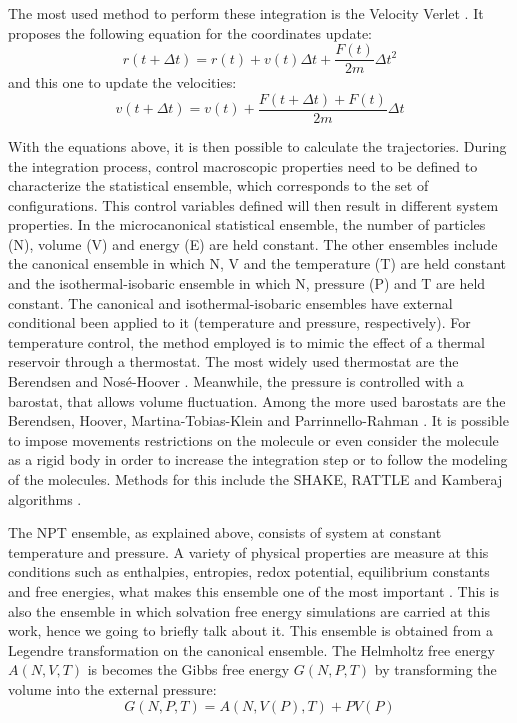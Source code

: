 The most used method to perform these integration is the Velocity Verlet \cite{verlet}. It proposes the following equation for the coordinates update:
\begin{equation}
r(t+ \Delta t) = r(t) +v(t) \Delta t + \frac{F(t)}{2m} \Delta t^{2}
\end{equation}
and this one to update the velocities:
\begin{equation}
v(t+ \Delta t) = v(t) +\frac{F(t+ \Delta t) +F(t)}{2m} \Delta t
\end{equation}

With the equations above, it is then possible to calculate the trajectories. During the integration process, control macroscopic properties need to be defined  to characterize the statistical ensemble, which corresponds to the set of configurations.  This control variables defined will then result in different system properties. In the microcanonical statistical ensemble, the number of particles (N), volume (V) and energy (E) are held constant.  The other ensembles include the canonical ensemble in which N, V and the temperature (T) are held constant and the isothermal-isobaric ensemble in which N, pressure (P) and T are held constant.  The canonical and isothermal-isobaric ensembles have external conditional been applied to it (temperature and pressure, respectively). For temperature control, the method employed  is to mimic the effect of a thermal reservoir through a thermostat. The most widely used thermostat are the Berendsen and Nosé-Hoover \cite{doi:10.1063/1.448118,PhysRevA.31.1695}. Meanwhile, the pressure is controlled with a barostat, that allows volume fluctuation. Among the more used barostats are the Berendsen, Hoover, Martina-Tobias-Klein and Parrinnello-Rahman \cite{doi:10.1063/1.448118,PhysRevA.31.1695,doi:10.1063/1.467468,doi:10.1063/1.328693}. It is possible to impose movements restrictions on the molecule or even consider the molecule as a rigid body in order to increase the integration step or to follow the modeling of the molecules. Methods for this include the SHAKE, RATTLE and Kamberaj algorithms \cite{RYCKAERT1977327,anderson1983,kamberaj}. 

The NPT ensemble, as explained above, consists of system at constant temperature and pressure. A variety of physical properties are measure at this conditions such as enthalpies, entropies, redox potential, equilibrium constants and free energies, what makes this ensemble one of the most important \cite{tuckerman}. This is also the ensemble in which solvation free energy simulations are carried at this work, hence we going to briefly talk about it. This ensemble is obtained from a Legendre transformation on the canonical ensemble. The Helmholtz free energy $A(N,V,T)$ is becomes the Gibbs free energy $G(N,P,T)$ by transforming the volume into the external pressure:
\begin{equation}
G(N,P,T) = A(N,V(P),T) + PV(P)
\end{equation}


